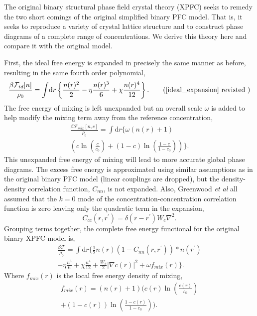 \documentclass[showkeys, prb, reprint]{revtex4-1}
\renewcommand{\d}{\delta}       %
\newcommand{\F}{\mathcal{F}}    %
\renewcommand{\l}{\left}        %
\renewcommand{\r}{\right}       %
\newcommand{\f}{\frac}          %
\newcommand{\integrate}[1]{\int\!\mathrm{d}#1}
\begin{document}
The original  binary structural phase field crystal theory (XPFC) seeks to remedy the two
short comings of the original simplified binary PFC model. That is, it seeks to reproduce
a variety of crystal lattice structure and to construct  phase diagrams of a complete
range of concentrations. We derive this theory here and compare it with the original model.

First, the ideal free energy is expanded in precisely the same manner as before, resulting
in the same fourth order polynomial,
%
\begin{equation}
    \f{\beta\F_{id}[n]}{\rho_0} = \integrate{r}
        \l\lbrace \f{n(r)^2}{2} - \eta \f{n(r)^3}{6} + \chi\f{n(r)^4}{12}
        \r\rbrace. \tag{\ref{ideal_expansion} revisted }
\end{equation}
%
The free energy of mixing is left unexpanded but an overall scale $\omega$ is
added to help modify the mixing term away from the reference concentration,
%
\begin{multline}
    \f{\beta\F_{mix}[n, c]}{\rho_0} =
        \integrate{r} \Bigg\{ \omega (n(r) + 1) \\ \l( 
            c\ln\l(\f{c}{c_0}\r) + (1-c)\ln\l(\f{1-c}{1-c_0}\r) \r) \Bigg\}. 
\end{multline}
%
This unexpanded free energy of mixing will lead to more accurate global phase
diagrams. The excess free energy is approximated using similar assumptions as
in the original binary PFC model (linear couplings are dropped), but the density-density
correlation function, $C_{nn}$, is not expanded. Also, Greenwood \textit{et
al} all assumed that the $k=0$ mode of the concentration-concentration
correlation function is zero leaving only the quadratic term in the expansion,
%
\begin{equation}
    C_{cc}(r, r^\prime) = \d(r - r^\prime)W_c \nabla^2.
\end{equation}
%
Grouping terms together, the complete free energy functional for the original binary
XPFC model is,
%
\begin{multline}
    \f{\beta\F}{\rho_0} = \integrate{r} \Bigg\{ 
        \f{1}{2} n(r) \l(1 - C_{nn}(r, r^\prime)\r) \ast n(r^\prime) \\
        - \eta \f{n^3}{6} + \chi \f{n^4}{12}
        + \f{W_c}{2}\l\vert \nabla c(r) \r\vert^2 + \omega f_{mix}(r)\Bigg\}. 
\end{multline}
%
Where $f_{mix}(r)$ is the local free energy density of mixing,
%
\begin{multline}
    f_{mix}(r) = \l(n(r) + 1\r)\Bigg( 
            c(r)\ln\l(\f{c(r)}{c_0}\r) \\+ (1-c(r))\ln\l(\f{1-c(r)}{1-c_0}\r) \Bigg).
\end{multline}
%
\end{document}
